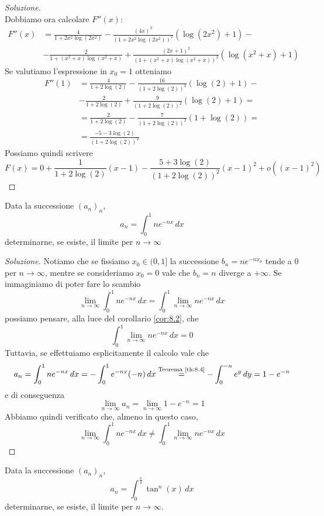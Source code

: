 \begin{proof}[Soluzione]
\[    \]
    Dobbiamo ora calcolare $F''(x)$:
    \[
    \begin{split}
        F''(x) & = \frac{4}{1+2x^2\log(2x^2)}-\frac{(4x)^2}{(1+2x^2\log(2x^2))^2}\left(\log(2x^2)+1\right)- \\
        & - \frac{2}{1+(x^2+x)\log(x^2+x)}+\frac{(2x+1)^2}{(1+(x^2+x)\log(x^2+x))^2}\left(\log(x^2+x)+1\right)
    \end{split}
    \]
    Se valutiamo l'espressione in $x_0=1$ otteniamo
    \[
    \begin{split}
        F''(1) & = \frac{4}{1+2\log(2)}-\frac{16}{(1+2\log(2))^2}(\log(2)+1)-\\
        & - \frac{2}{1+2\log(2)}+\frac{9}{(1+2\log(2))^2}(\log(2)+1) = \\
        & = \frac{2}{1+2\log(2)}-\frac{7}{(1+2\log(2))^2}(1+\log(2)) =\\
        & = \frac{-5-3\log(2)}{(1+2\log(2))^2}
    \end{split}
    \]
    Possiamo quindi scrivere
    \[
    F(x) = 0 + \frac{1}{1+2\log(2)}(x-1)-\frac{5+3\log(2)}{(1+2\log(2))^2}(x-1)^2 +o((x-1)^2)
    \]
\end{proof}
\begin{exercise}
    \label{ex:9.4}
    Data la successione $(a_n)_n$, 
    \[
    a_n = \int_0^1 n e^{-nx}\, dx
    \]
    determinarne, se esiste, il limite per $n\to\infty$
\end{exercise}
\begin{proof}[Soluzione]
    Notiamo che se fissiamo $x_0\in(0,1]$ la successione $b_n = ne^{-nx_0} $ tende a 0 per $n\to \infty$, mentre se consideriamo $x_0=0$ vale che $b_n = n $ diverge a $+\infty$. Se immaginiamo di poter fare lo scambio
    \[
    \lim_{n\to\infty}\int_0^1 ne^{-nx}\, dx = \int_0^1 \lim_{n\to \infty} ne^{-nx}\, dx
    \]
    possiamo pensare, alla luce del corollario \ref{cor:8.2}, che 
    \[
    \int_0^1 \lim_{n\to \infty} ne^{-nx}\, dx = 0
    \]
    Tuttavia, se effettuiamo esplicitamente il calcolo vale che
    \[
    a_n = \int_0^1 ne^{-nx}\, dx = -\int_0^1 e^{-nx}(-n)\, dx \overset{\text{Teorema \ref{th:8.4}}}{=} -\int_0^{-n} e^{y}\, dy = 1-e^{-n}  
    \]
    e di conseguenza
    \[
    \lim_{n\to\infty} a_n = \lim_{n\to\infty}1-e^{-n} = 1
    \]
    Abbiamo quindi verificato che, almeno in questo caso, 
    \[
    \lim_{n\to\infty}\int_0^1 ne^{-nx}\, dx \ne \int_0^1 \lim_{n\to \infty} ne^{-nx}\, dx
    \]
\end{proof}
\begin{exercise}
    \label{ex:9.5}
    Data la successione $(a_n)_n$,
    \[
    a_n = \int_0^{\frac{\pi}{4}} \tan^n(x)\, dx
    \]
    determinarne, se esiste, il limite per $n\to\infty$.
\end{exercise}
